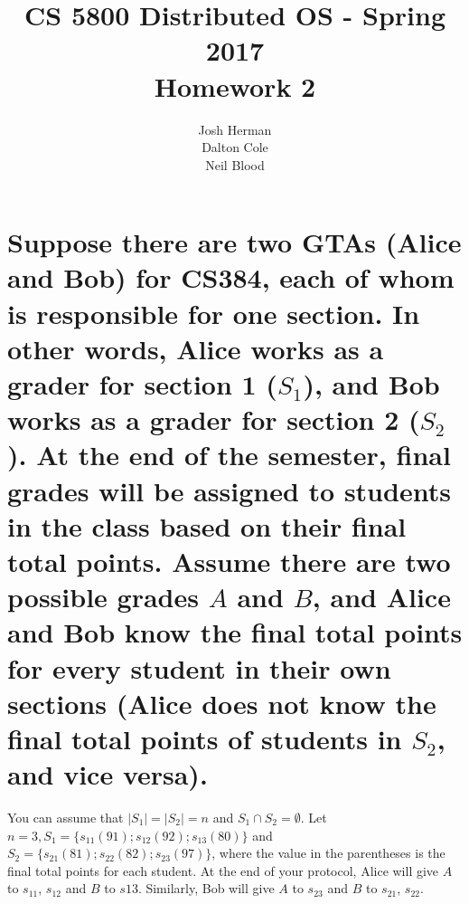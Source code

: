 \documentclass[times]{article}
\begin{document}
	\title{CS 5800 Distributed OS - Spring 2017 \\ Homework 2}
	\author{Josh Herman \\ Dalton Cole \\ Neil Blood}
	\date{}
	\maketitle

	\section{Suppose there are two GTAs (Alice and Bob) for CS384, each of whom	is responsible for one section. In other words, Alice works as a grader for section 1 ($S_1$), and Bob works as a grader for section 2 ($S_2$). At the end of the semester, final grades will be assigned to students in the class based on their final total points. Assume there are two possible grades $A$ and $B$, and Alice and Bob know the final total points for every student in their own sections (Alice does not know the final total points of students in $S_2$, and vice versa).}
	
	 \qquad You can assume that $|S_1| = |S_2| = n$ and $S_1 \cap S_2 = \emptyset $. Let $n = 3, S_1 = \{s_{11}(91); s_{12}(92); s_{13}(80)\} $ and $S_2 = \{s_{21}(81); s_{22}(82); s_{23}(97)\}$, where the value in the parentheses is the final total points for each student. At the end of your protocol, Alice will give $A$ to $s_{11}$, $s_{12}$ and $B$ to $s13$. Similarly, Bob will give $A$ to $s_{23}$ and $B$ to $s_{21}$, $s_{22}$.
	 
\end{document}
